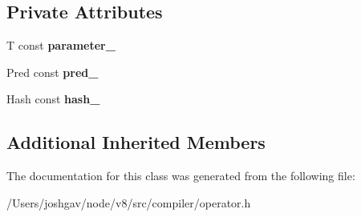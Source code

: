 \subsection*{Private Attributes}
\begin{DoxyCompactItemize}
\item 
T const {\bfseries parameter\+\_\+}\hypertarget{classv8_1_1internal_1_1compiler_1_1_operator1_aec54691d94635b49a50a09a013e0aae4}{}\label{classv8_1_1internal_1_1compiler_1_1_operator1_aec54691d94635b49a50a09a013e0aae4}

\item 
Pred const {\bfseries pred\+\_\+}\hypertarget{classv8_1_1internal_1_1compiler_1_1_operator1_acfac6c8510ec046dc398e795d93b3a90}{}\label{classv8_1_1internal_1_1compiler_1_1_operator1_acfac6c8510ec046dc398e795d93b3a90}

\item 
Hash const {\bfseries hash\+\_\+}\hypertarget{classv8_1_1internal_1_1compiler_1_1_operator1_a2c005ce55f6d0e8d26dadb370eeb5911}{}\label{classv8_1_1internal_1_1compiler_1_1_operator1_a2c005ce55f6d0e8d26dadb370eeb5911}

\end{DoxyCompactItemize}
\subsection*{Additional Inherited Members}


The documentation for this class was generated from the following file\+:\begin{DoxyCompactItemize}
\item 
/\+Users/joshgav/node/v8/src/compiler/operator.\+h\end{DoxyCompactItemize}
